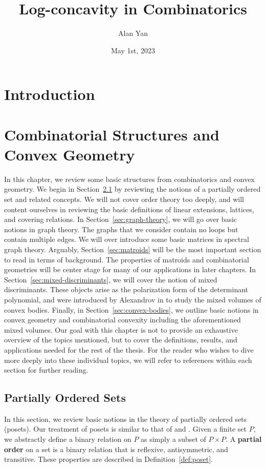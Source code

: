 \documentclass{puthesis-UG}
\author{Alan Yan}
\title{Log-concavity in Combinatorics}
\date{May 1st, 2023}
\begin{document}
\chapter{Introduction}

\chapter{Combinatorial Structures and Convex Geometry}

In this chapter, we review some basic structures from combinatorics and convex geometry. We begin in Section~\ref{sec:posets} by reviewing the notions of a partially ordered set and related concepts. We will not cover order theory too deeply, and will content ourselves in reviewing the basic definitions of linear extensions, lattices, and covering relations. In Section~\ref{sec:graph-theory}, we will go over basic notions in graph theory. The graphs that we consider contain no loops but contain multiple edges. We will over introduce some basic matrices in spectral graph theory. Arguably, Section~\ref{sec:matroids} will be the most important section to read in terms of background. The properties of matroids and combinatorial geometries will be center stage for many of our applications in later chapters. In Section~\ref{sec:mixed-discriminants}, we will cover the notion of mixed discriminants. These objects arise as the polarization form of the determinant polynomial, and were introduced by Alexandrov in \cite{aleksandrov} to study the mixed volumes of convex bodies. Finally, in Section~\ref{sec:convex-bodies}, we outline basic notions in convex geometry and combinatorial convexity including the aforementioned mixed volumes. Our goal with this chapter is not to provide an exhaustive overview of the topics mentioned, but to cover the definitions, results, and applications needed for the rest of the thesis. For the reader who wishes to dive more deeply into these individual topics, we will refer to references within each section for further reading. 

\section{Partially Ordered Sets} \label{sec:posets}

In this section, we review basic notions in the theory of partially ordered sets (posets). Our treatment of posets is similar to that of \cite{ordered-sets} and \cite{Rota1964}. Given a finite set $P$, we abstractly define a binary relation on $P$ as simply a subset of $P \times P$. A \textbf{partial order} on a set is a binary relation that is reflexive, antisymmetric, and transitive. These properties are described in Definition~\ref{def:poset}. 
\end{document}

